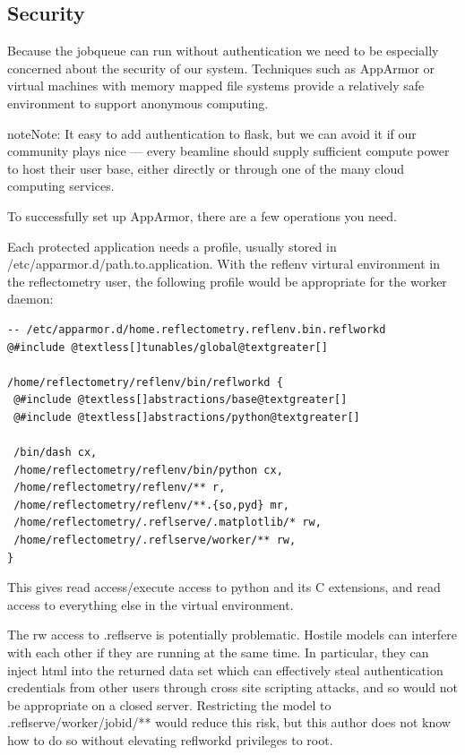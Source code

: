 \documentclass[letterpaper,10pt,english]{sphinxmanual}
\begin{document}
\subsection{Security}
\label{getting_started/server:security}
Because the jobqueue can run without authentication we need to be
especially concerned about the security of our system.  Techniques
such as AppArmor or virtual machines with memory mapped file systems
provide a relatively safe environment to support anonymous computing.

\begin{notice}{note}{Note:}
It easy to add authentication to flask, but we can avoid it if our
community plays nice --- every beamline should supply sufficient
compute power to host their user base, either directly or through one of
the many cloud computing services.
\end{notice}

To successfully set up AppArmor, there are a few operations you need.

Each protected application needs a profile, usually stored in
/etc/apparmor.d/path.to.application.  With the reflenv virtural
environment in the reflectometry user, the following profile
would be appropriate for the worker daemon:

\begin{Verbatim}[commandchars=@\[\]]
-- /etc/apparmor.d/home.reflectometry.reflenv.bin.reflworkd
@#include @textless[]tunables/global@textgreater[]

/home/reflectometry/reflenv/bin/reflworkd {
 @#include @textless[]abstractions/base@textgreater[]
 @#include @textless[]abstractions/python@textgreater[]

 /bin/dash cx,
 /home/reflectometry/reflenv/bin/python cx,
 /home/reflectometry/reflenv/** r,
 /home/reflectometry/reflenv/**.{so,pyd} mr,
 /home/reflectometry/.reflserve/.matplotlib/* rw,
 /home/reflectometry/.reflserve/worker/** rw,
}
\end{Verbatim}

This gives read access/execute access to python and its C extensions,
and read access to everything else in the virtual environment.

The rw access to .reflserve is potentially problematic.  Hostile
models can interfere with each other if they are running at the same time.
In particular, they can inject html into the returned data set which can
effectively steal authentication credentials from other users through
cross site scripting attacks, and so would not be appropriate on a closed
server.  Restricting the model to .reflserve/worker/jobid/** would reduce
this risk, but this author does not know how to do so without elevating
reflworkd privileges to root.
\end{document}

